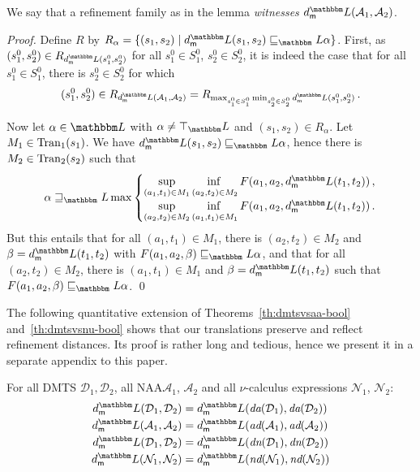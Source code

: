 \documentclass[twocolumn]{svjour3-dummy}
\newcommand*\cD{\mathcal D}
\newcommand*\NAA{NAA\xspace}
\newcommand*\cA{\mathcal A}
\newcommand*\Tran{\textup{\textrm{Tran}}}
\newcommand*\db{\textit{da}} \newcommand*\bd{\textit{ad}} \newcommand*\bigmid{\mathrel{\big|}}
\newcommand*\cN{\mathcal N}
\newcommand*\ddh{\textit{dn}} \newcommand*\hd{\textit{nd}} \newcommand*\viz{\textit{viz.}\xspace}
\newcommand*\LL{\mathbbm L}
\begin{document}
We say that a refinement family as in the lemma \emph{witnesses} $\mdl(
\cA_1, \cA_2)$.

\begin{proof}
  Define $R$ by $R_\alpha=\{( s_1, s_2)\mid \mdl( s_1,
  s_2)\sqsubseteq_\LL \alpha\}$.  First, as $( s^0_1, s^0_2)\in R_{
    \mdl( s^0_1, s^0_2)}$ for all $s^0_1\in S^0_1$, $s^0_2\in S^0_2$, it
  is indeed the case that for all $s^0_1\in S^0_1$, there is $s^0_2\in
  S^0_2$ for which
  \begin{equation*}
    ( s^0_1, s^0_2)\in R_{ \mdl( \cA_1, \cA_2)}= R_{
      \max_{ s^0_1\in S^0_1} \min_{ s^0_2\in S^0_2} \mdl( s^0_1, s^0_2)}\,.
  \end{equation*}

  Now let $\alpha\in \LL$ with $\alpha\ne \top_\LL$ and $( s_1, s_2)\in
  R_\alpha$.  Let $M_1\in \Tran_1( s_1)$.  We have $\mdl( s_1,
  s_2)\sqsubseteq_\LL \alpha$, hence there is $M_2\in \Tran_2( s_2)$
  such that
  \begin{equation*}
    \alpha\sqsupseteq_\LL \max
    \begin{cases}
      &\hspace*{-1em} \adjustlimits \sup_{( a_1, t_1)\in M_1} \inf_{(
        a_2, t_2)\in M_2} F( a_1, a_2, \mdl( t_1, t_2))\,, \\
      &\hspace*{-1em} \adjustlimits \sup_{( a_2, t_2)\in M_2} \inf_{(
        a_1, t_1)\in M_1} F( a_1, a_2, \mdl( t_1, t_2))\,.
    \end{cases}
  \end{equation*}
  But this entails that for all $( a_1, t_1)\in M_1$, there is $( a_2,
  t_2)\in M_2$ and $\beta= \mdl( t_1, t_2)$ with $F( a_1, a_2,
  \beta)\sqsubseteq_\LL \alpha$, and that for all $( a_2, t_2)\in M_2$,
  there is $( a_1, t_1)\in M_1$ and $\beta= \mdl( t_1, t_2)$ such that
  $F( a_1, a_2, \beta)\sqsubseteq_\LL \alpha$. \qed
\end{proof}

The following quantitative extension of Theorems~\ref{th:dmtsvsaa-bool}
and~\ref{th:dmtsvsnu-bool} shows that our translations preserve and
reflect refinement distances.  Its proof is rather long and tedious,
hence we present it in a separate appendix to this paper.

\begin{theorem}
  \label{th:trans-moddist}
  For all DMTS $\cD_1, \cD_2$, all \NAA $\cA_1$, $\cA_2$ and all
  $\nu$-calculus expressions $\cN_1$, $\cN_2$:
  \begin{align*}
    \mdl( \cD_1, \cD_2) &= \mdl( \db( \cD_1), \db( \cD_2)) \\
    \mdl( \cA_1, \cA_2) &= \mdl( \bd( \cA_1), \bd( \cA_2)) \\
    \mdl( \cD_1, \cD_2) &= \mdl( \ddh( \cD_1), \ddh( \cD_2)) \\
    \mdl( \cN_1, \cN_2) &= \mdl( \hd( \cN_1), \hd( \cN_2))
  \end{align*}
\end{theorem}
\end{document}

